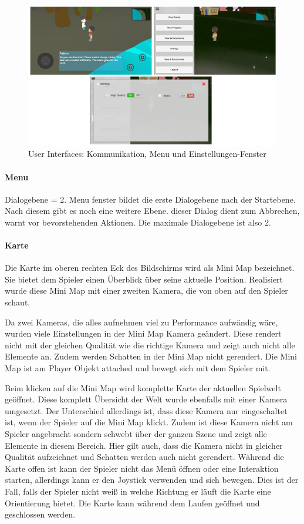 				\begin{figure}[htbp]
					\centering 
					\label{userInterfaces}
					\includegraphics[width=\textwidth]{pics/userInterface.png}
					\caption{User Interfaces: Kommunikation, Menu und Einstellungen-Fenster}
				\end{figure}
			
			\paragraph{Menu}
				Dialogebene = 2. Menu fenster bildet die erste Dialogebene nach der Startebene. Nach diesem gibt es noch eine weitere Ebene.
				dieser Dialog dient zum Abbrechen, warnt vor bevorstehenden Aktionen. Die maximale Dialogebene ist also 2. 
			
			\paragraph{Karte}
				Die Karte im oberen rechten Eck des Bildschirms wird als Mini Map bezeichnet. Sie bietet dem Spieler einen Überblick über seine aktuelle Position. Realisiert wurde diese Mini Map mit einer zweiten Kamera, die von oben auf den Spieler schaut.
				
				Da zwei Kameras, die alles aufnehmen viel zu Performance aufwändig wäre, wurden viele Einstellungen in der Mini Map Kamera geändert. Diese rendert nicht mit der gleichen Qualität wie die richtige Kamera und zeigt auch nicht alle Elemente an. Zudem werden Schatten in der Mini Map nicht gerendert. Die Mini Map ist am Player Objekt attached und bewegt sich mit dem Spieler mit.
				
				Beim klicken auf die Mini Map wird komplette Karte der aktuellen Spielwelt geöffnet. Diese komplett Übersicht der Welt wurde ebenfalls mit einer Kamera umgesetzt. Der Unterschied allerdings ist, dass diese Kamera nur eingeschaltet ist, wenn der Spieler auf die Mini Map klickt. Zudem ist diese Kamera nicht am Spieler angebracht sondern schwebt über der ganzen Szene und zeigt alle Elemente in diesem Bereich. Hier gilt auch, dass die Kamera nicht in gleicher Qualität aufzeichnet und Schatten werden auch nicht gerendert. Während die Karte offen ist kann der Spieler nicht das Menü öffnen oder eine Interaktion starten, allerdings kann er den Joystick verwenden und sich bewegen. Dies ist der Fall, falls der Spieler nicht weiß in welche Richtung er läuft die Karte eine Orientierung bietet. Die Karte kann während dem Laufen geöffnet und geschlossen werden.
			
